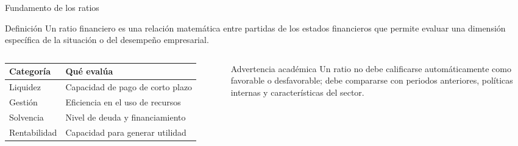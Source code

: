 \begin{frame}{Fundamento de los ratios}
\small
\begin{block}{Definición}
Un ratio financiero es una relación matemática entre partidas de los estados financieros que permite evaluar una dimensión específica de la situación o del desempeño empresarial.
\end{block}

\begin{columns}[T,totalwidth=\textwidth]
\begin{tabular}{ll}
\toprule
Categoría & Qué evalúa \\
\midrule
Liquidez & Capacidad de pago de corto plazo \\
Gestión & Eficiencia en el uso de recursos \\
Solvencia & Nivel de deuda y financiamiento \\
Rentabilidad & Capacidad para generar utilidad \\
\bottomrule
\end{tabular}

\begin{alertblock}{Advertencia académica}
Un ratio no debe calificarse automáticamente como favorable o desfavorable; debe compararse con periodos anteriores, políticas internas y características del sector.
\end{alertblock}

\begin{center}
\end{center}
\end{columns}
\end{frame}
